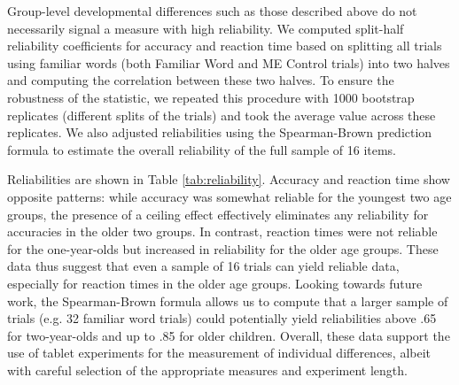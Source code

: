 \documentclass[man,noapacite]{apa2}
\begin{document}

Group-level developmental differences such as those described above do not necessarily signal a measure with high reliability. We computed split-half reliability coefficients for accuracy and reaction time based on splitting all trials using familiar words (both Familiar Word and ME Control trials) into two halves and computing the correlation between these two halves. To ensure the robustness of the statistic, we repeated this procedure with 1000 bootstrap replicates (different splits of the trials) and took the average value across these replicates. We also adjusted reliabilities using the Spearman-Brown prediction formula \cite{bartko1976} to estimate the overall reliability of the full sample of 16 items.

Reliabilities are shown in Table \ref{tab:reliability}. Accuracy and reaction time show opposite patterns: while accuracy was somewhat reliable for the youngest two age groups, the presence of a ceiling effect effectively eliminates any reliability for accuracies in the older two groups. In contrast, reaction times were not reliable for the one-year-olds but increased in reliability for the older age groups. These data thus suggest that even a sample of 16 trials can yield reliable data, especially for reaction times in the older age groups. Looking towards future work, the Spearman-Brown formula allows us to compute that a larger sample of trials (e.g. 32 familiar word trials) could potentially yield reliabilities above .65 for two-year-olds and up to .85 for older children. Overall, these data support the use of tablet experiments for the measurement of individual differences, albeit with careful selection of the appropriate measures and experiment length. 
\end{document}
